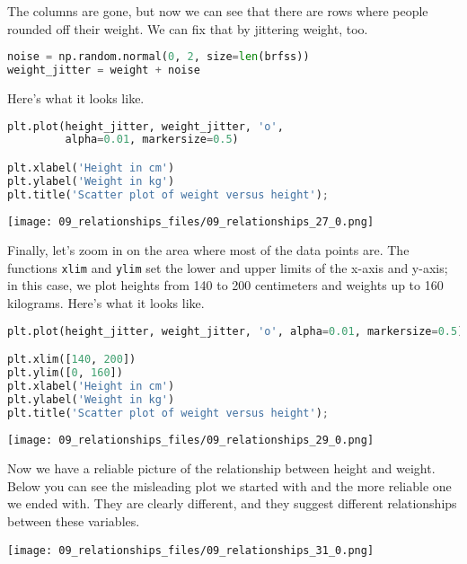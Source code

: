 The columns are gone, but now we can see that there are rows where
people rounded off their weight. We can fix that by jittering weight,
too.

\begin{lstlisting}[language=Python,style=source]
noise = np.random.normal(0, 2, size=len(brfss))
weight_jitter = weight + noise
\end{lstlisting}

Here's what it looks like.

\begin{lstlisting}[language=Python,style=source]
plt.plot(height_jitter, weight_jitter, 'o', 
         alpha=0.01, markersize=0.5)

plt.xlabel('Height in cm')
plt.ylabel('Weight in kg')
plt.title('Scatter plot of weight versus height');
\end{lstlisting}

\begin{center}
\texttt{[image: 09\_relationships\_files/09\_relationships\_27\_0.png]}
\end{center}

Finally, let's zoom in on the area where most of the data points are.
The functions \passthrough{\lstinline!xlim!} and
\passthrough{\lstinline!ylim!} set the lower and upper limits of the
x-axis and y-axis; in this case, we plot heights from 140 to 200
centimeters and weights up to 160 kilograms. Here's what it looks like.

\begin{lstlisting}[language=Python,style=source]
plt.plot(height_jitter, weight_jitter, 'o', alpha=0.01, markersize=0.5)

plt.xlim([140, 200])
plt.ylim([0, 160])
plt.xlabel('Height in cm')
plt.ylabel('Weight in kg')
plt.title('Scatter plot of weight versus height');
\end{lstlisting}

\begin{center}
\texttt{[image: 09\_relationships\_files/09\_relationships\_29\_0.png]}
\end{center}

Now we have a reliable picture of the relationship between height and
weight. Below you can see the misleading plot we started with and the
more reliable one we ended with. They are clearly different, and they
suggest different relationships between these variables.



\begin{center}
\texttt{[image: 09\_relationships\_files/09\_relationships\_31\_0.png]}
\end{center}

